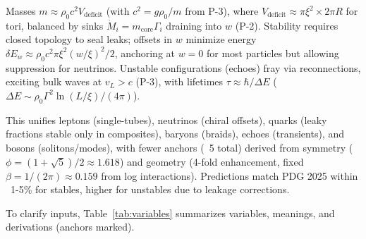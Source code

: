\documentclass{article}
\begin{document}
Masses $m \approx \rho_0 c^2 V_{\text{deficit}}$ (with $c^2 = g \rho_0 / m$ from P-3), where $V_{\text{deficit}} \approx \pi \xi^2 \times 2\pi R$ for tori, balanced by sinks $\dot{M}_i = m_{\text{core}} \Gamma_i$ draining into $w$ (P-2). Stability requires closed topology to seal leaks; offsets in $w$ minimize energy $\delta E_w \approx \rho_0 c^2 \pi \xi^2 (w / \xi)^2 / 2$, anchoring at $w=0$ for most particles but allowing suppression for neutrinos. Unstable configurations (echoes) fray via reconnections, exciting bulk waves at $v_L > c$ (P-3), with lifetimes $\tau \approx \hbar / \Delta E$ ($\Delta E \sim \rho_0 \Gamma^2 \ln(L / \xi) / (4\pi)$).

This unifies leptons (single-tubes), neutrinos (chiral offsets), quarks (leaky fractions stable only in composites), baryons (braids), echoes (transients), and bosons (solitons/modes), with fewer anchors (~5 total) derived from symmetry ($\phi = (1 + \sqrt{5})/2 \approx 1.618$) and geometry (4-fold enhancement, fixed $\beta = 1/(2\pi) \approx 0.159$ from log interactions). Predictions match PDG 2025 within ~1-5\% for stables, higher for unstables due to leakage corrections.

To clarify inputs, Table~\ref{tab:variables} summarizes variables, meanings, and derivations (anchors marked).
\end{document}
